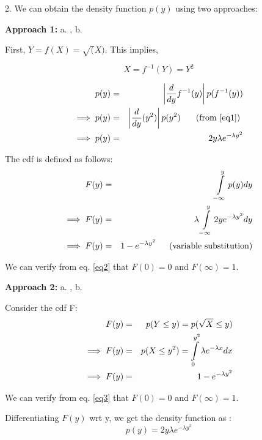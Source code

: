 \documentclass[11pt]{article}
\begin{document}
\par 2. We can obtain the density function $p(y)$ using two approaches:

\par \textbf{Approach 1:} a. , b.

First, $Y = f(X) = \sqrt(X)$. This implies, 

\begin{equation} 
X = f^{-1}(Y) = Y^2
\label{eq1}
\end{equation}

\begin{eqnarray*}
p(y) &=& \left | \frac{d}{dy} f^{-1} (y)\right | p(f^{-1}(y)) \\
\implies p(y) &=& \left | \frac{d}{dy} (y^2) \right | p(y^2) \: \: \: \: \: \: \: \: \mbox{(from \ref{eq1}) }\\
\implies p(y)  &=& 2y\lambda e^{-\lambda y^2}
\end{eqnarray*}

The cdf is defined as follows:
\vspace{-10pt}
\begin{eqnarray}
 F(y) &=& \int\limits_{-\infty}^{y} p(y) dy \notag \\
\implies F(y) &=& \lambda \int\limits_{-\infty}^{y} 2y e^{-\lambda y^2} dy \notag \\
\implies F(y) &=& 1 - e^{-\lambda y^2} \: \: \: \: \: \: \: \mbox{(variable substitution)}
\label{eq2}
\end{eqnarray}

We can verify from eq. \ref{eq2} that $F(0) = 0$ and $F(\infty) = 1$.

\par \textbf{Approach 2:} a. , b.

Consider the cdf F:
\vspace{-8pt}
\begin{eqnarray}
F(y) &=& p(Y \le y) = p(\sqrt{X} \le y) \notag \\
\implies F(y) &=& p(X \le y^2) = \int\limits_{0}^{y^2} \lambda e^{-\lambda x} dx \notag \\
\implies F(y) &=& 1-e^{-\lambda y^2} 
\label{eq3}
\end{eqnarray}

We can verify from eq. \ref{eq3} that $F(0) = 0$ and $F(\infty) = 1$.

Differentiating $F(y)$ wrt y, we get the density function as :
\vspace{-8pt}
\begin{equation*}
p(y) = 2y\lambda e^{-\lambda y^2}
\end{equation*}
\end{document}
